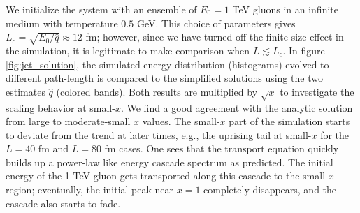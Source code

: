 We initialize the system with an ensemble of $E_0=1$ TeV gluons in an infinite medium with temperature $0.5$ GeV.
This choice of parameters gives $L_c = \sqrt{E_0/\hat{q}} \approx 12$ fm;
however, since we have turned off the finite-size effect in the simulation, it is legitimate to make comparison when $L\lesssim L_c$.
In figure \ref{fig:jet_solution}, the simulated energy distribution (histograms) evolved to different path-length is compared to the simplified solutions using the two estimates $\hat{q}$ (colored bands).
Both results are multiplied by $\sqrt{x}$ to investigate the scaling behavior at small-$x$.
We find a good agreement with the analytic solution from large to moderate-small $x$ values. 
The small-$x$ part of the simulation starts to deviate from the trend at later times, e.g., the uprising tail at small-$x$ for the $L=40$ fm and $L=80$ fm cases.
One sees that the transport equation quickly builds up a power-law like energy cascade spectrum as predicted. 
The initial energy of the 1 TeV gluon gets transported along this cascade to the small-$x$ region; eventually, the initial peak near $x=1$ completely disappears, and the cascade also starts to fade.


